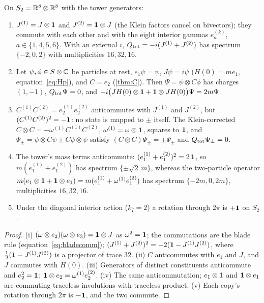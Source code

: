 \begin{proposition}
\label{d6:prop:dirac}
On $S_2=\mathbb{R}^8\otimes\mathbb{R}^8$ with the tower generators:
\begin{enumerate}[label=(\roman*),leftmargin=2.2em]
\item $J^{(1)}=J\otimes\mathbf 1$ and $J^{(2)}=\mathbf 1\otimes J$ (the Klein factors cancel on bivectors); they commute with each other and with the eight
interior gammas $e^{(k)}_a$, $a\in\{1,4,5,6\}$. With an external $i$, $Q_{\rm tot}=-i(J^{(1)}+J^{(2)})$ has spectrum $\{-2,0,2\}$ with
multiplicities $16,32,16$.
\item Let $\psi,\phi\in S\otimes\mathbb{C}$ be particles at rest, $e_1\psi=\psi$, $J\psi=i\psi$ ($H(0)=me_1$, equation~\cref{eq:Hp}), and $C=e_2$
(\cref{thm:C}). Then $\Psi=\psi\otimes C\phi$ has charges $(1,-1)$, $Q_{\rm tot}\Psi=0$, and
$-i\bigl(JH(0)\otimes\mathbf 1+\mathbf 1\otimes JH(0)\bigr)\Psi=2m\Psi$.
\item $C^{(1)}C^{(2)}=e^{(1)}_2e^{(2)}_2$ anticommutes with $J^{(1)}$ and $J^{(2)}$, but $(C^{(1)}C^{(2)})^2=-\mathbf 1$: no state is mapped to $\pm$ itself.
The Klein-corrected $C\otimes C=-\omega^{(1)}C^{(1)}C^{(2)}$, $\omega^{(1)}=\omega\otimes\mathbf 1$, squares to $\mathbf 1$, and $\Psi_\pm=\psi\otimes C\psi\pm C\psi\otimes\psi$
satisfy $(C\otimes C)\Psi_\pm=\pm\Psi_\pm$ and $Q_{\rm tot}\Psi_\pm=0$.
\item The tower's mass terms anticommute: $(e^{(1)}_1+e^{(2)}_1)^2=2\,\mathbf 1$, so $m(e^{(1)}_1+e^{(2)}_1)$ has spectrum $\{\pm\sqrt2\,m\}$, whereas the
two-particle operator $m(e_1\otimes\mathbf 1+\mathbf 1\otimes e_1)=m(e^{(1)}_1+\omega^{(1)}e^{(2)}_1)$ has spectrum $\{-2m,0,2m\}$, multiplicities $16,32,16$.
\item Under the diagonal interior action ($k_I=2$) a rotation through $2\pi$ is $+\mathbf 1$ on $S_2$.
\end{enumerate}
\end{proposition}

\begin{proof}
(i) $(\omega\otimes e_2)(\omega\otimes e_3)=\mathbf 1\otimes J$ as $\omega^2=\mathbf 1$; the commutations are the blade rule (equation~\cref{eq:bladecomm});
$(J^{(1)}+J^{(2)})^2=-2(\mathbf 1-J^{(1)}J^{(2)})$, where $\tfrac12(\mathbf 1-J^{(1)}J^{(2)})$ is a projector of trace $32$. (ii) $C$ anticommutes with $e_1$ and $J$, and
$J$ commutes with $H(0)$. (iii) Generators of distinct constituents anticommute and $e_2^2=\mathbf 1$; $\mathbf 1\otimes e_2=\omega^{(1)}e^{(2)}_2$. (iv) The
same anticommutation; $e_1\otimes\mathbf 1$ and $\mathbf 1\otimes e_1$ are commuting traceless involutions with traceless product. (v) Each copy's rotation
through $2\pi$ is $-\mathbf 1$, and the two commute.
\end{proof}

